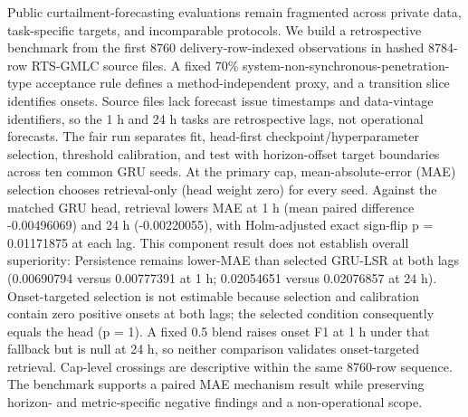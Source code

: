 Public curtailment-forecasting evaluations remain fragmented across private data, task-specific targets, and incomparable protocols. We build a retrospective benchmark from the first 8760 delivery-row-indexed observations in hashed 8784-row RTS-GMLC source files. A fixed 70\% system-non-synchronous-penetration-type acceptance rule defines a method-independent proxy, and a transition slice identifies onsets. Source files lack forecast issue timestamps and data-vintage identifiers, so the 1 h and 24 h tasks are retrospective lags, not operational forecasts. The fair run separates fit, head-first checkpoint/hyperparameter selection, threshold calibration, and test with horizon-offset target boundaries across ten common GRU seeds. At the primary cap, mean-absolute-error (MAE) selection chooses retrieval-only (head weight zero) for every seed. Against the matched GRU head, retrieval lowers MAE at 1 h (mean paired difference -0.00496069) and 24 h (-0.00220055), with Holm-adjusted exact sign-flip p = 0.01171875 at each lag. This component result does not establish overall superiority: Persistence remains lower-MAE than selected GRU-LSR at both lags (0.00690794 versus 0.00777391 at 1 h; 0.02054651 versus 0.02076857 at 24 h). Onset-targeted selection is not estimable because selection and calibration contain zero positive onsets at both lags; the selected condition consequently equals the head (p = 1). A fixed 0.5 blend raises onset F1 at 1 h under that fallback but is null at 24 h, so neither comparison validates onset-targeted retrieval. Cap-level crossings are descriptive within the same 8760-row sequence. The benchmark supports a paired MAE mechanism result while preserving horizon- and metric-specific negative findings and a non-operational scope.
